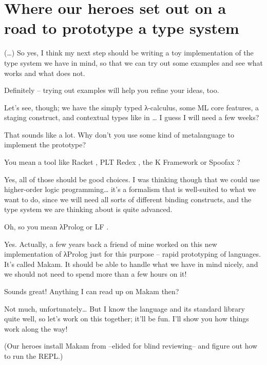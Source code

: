 \section{Where our heroes set out on a road to prototype a type
system}\label{where-our-heroes-set-out-on-a-road-to-prototype-a-type-system}

 (\ldots{}) So yes, I think my next step should be
writing a toy implementation of the type system we have in mind, so that
we can try out some examples and see what works and what does not.

 Definitely -- trying out examples will help you
refine your ideas, too.

\heroSTUDENT{} Let's see, though; we have the simply typed \foreignlanguage{greek}{λ}-calculus, some ML
core features, a staging construct, and contextual types like in
\citet{nanevski2008contextual}\ldots{} I guess I will need a few weeks?

\heroADVISOR{} That sounds like a lot. Why don't you use some kind of
metalanguage to implement the prototype?

\heroSTUDENT{} You mean a tool like Racket \citep{racket-manifesto}, PLT Redex
\citep{felleisen2009semantics}, the K Framework
\citep{k-framework-main-reference} or Spoofax
\citep{spoofax-main-reference}?

\heroADVISOR{} Yes, all of those should be good choices. I was thinking though
that we could use higher-order logic programming\ldots{} it's a
formalism that is well-suited to what we want to do, since we will need
all sorts of different binding constructs, and the type system we are
thinking about is quite advanced.

\heroSTUDENT{} Oh, so you mean \foreignlanguage{greek}{λ}Prolog \citep{miller1988overview} or LF
\citep{lf-main-reference}.

\heroADVISOR{} Yes. Actually, a few years back a friend of mine worked on this
new implementation of \foreignlanguage{greek}{λ}Prolog just for this purpose -- rapid prototyping
of languages. It's called Makam. It should be able to handle what we
have in mind nicely, and we should not need to spend more than a few
hours on it!

\heroSTUDENT{} Sounds great! Anything I can read up on Makam then?

\heroADVISOR{} Not much, unfortunately\ldots{} But I know the language and its
standard library quite well, so let's work on this together; it'll be
fun. I'll show you how things work along the way!

\begin{scenecomment}
(Our heroes install Makam from --elided for blind reviewing-- and figure out how to run the REPL.)
\end{scenecomment}
